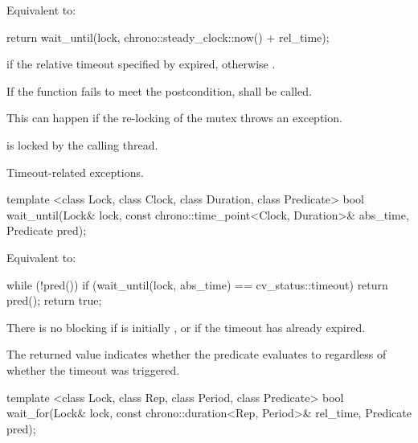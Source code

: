 \begin{itemdescr}
\pnum
\effects Equivalent to:
\begin{codeblock}
return wait_until(lock, chrono::steady_clock::now() + rel_time);
\end{codeblock}

\pnum
\returns {} if
the relative timeout specified by  expired,
otherwise .

\pnum
\remarks
If the function fails to meet the postcondition, 
shall be called.
\begin{note} This can happen if the re-locking of the mutex throws an exception. \end{note}

\pnum
\postconditions {} is locked by the calling thread.

\pnum
\throws Timeout-related
exceptions.

\end{itemdescr}

%
\begin{itemdecl}
template <class Lock, class Clock, class Duration, class Predicate>
  bool wait_until(Lock& lock, const chrono::time_point<Clock, Duration>& abs_time, Predicate pred);
\end{itemdecl}

\begin{itemdescr}
\pnum
\effects Equivalent to:
\begin{codeblock}
while (!pred())
  if (wait_until(lock, abs_time) == cv_status::timeout)
    return pred();
return true;
\end{codeblock}

\pnum
\begin{note} There is no blocking if  is initially , or
if the timeout has already expired. \end{note}

\pnum
\begin{note} The returned value indicates whether the predicate evaluates to 
regardless of whether the timeout was triggered. \end{note}
\end{itemdescr}

%
\begin{itemdecl}
template <class Lock, class Rep, class Period, class Predicate>
  bool wait_for(Lock& lock, const chrono::duration<Rep, Period>& rel_time, Predicate pred);
\end{itemdecl}

